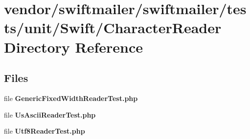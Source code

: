 \section{vendor/swiftmailer/swiftmailer/tests/unit/\+Swift/\+Character\+Reader Directory Reference}
\label{dir_4620acab3a639eb1c7823c4998691c64}
\subsection*{Files}
\begin{DoxyCompactItemize}
\item 
file {\bf Generic\+Fixed\+Width\+Reader\+Test.\+php}
\item 
file {\bf Us\+Ascii\+Reader\+Test.\+php}
\item 
file {\bf Utf8\+Reader\+Test.\+php}
\end{DoxyCompactItemize}
